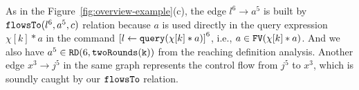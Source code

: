 As in the Figure~\ref{fig:overview-example}(c), 
the edge $l^6 \to a^5$ is built by $\mathtt{flowsTo}(l^6, a^5, c)$ relation because
$a$ is used directly in the query expression $\chi[k]*a$
in the command $\clabel{\assign{l}{\query(\chi[k]*a)}}^6$,
i.e., $a \in \mathtt{FV}(\chi[k]*a)$.
And we also have $a^5 \in \mathtt{RD}(6, \mathtt{twoRounds(k)})$ from the reaching definition analysis.
Another edge $x^3 \to j^5$ in the same graph represents the control flow from $j^5$ to $x^3$, which is soundly caught by our $\mathtt{flowsTo}$ relation.
